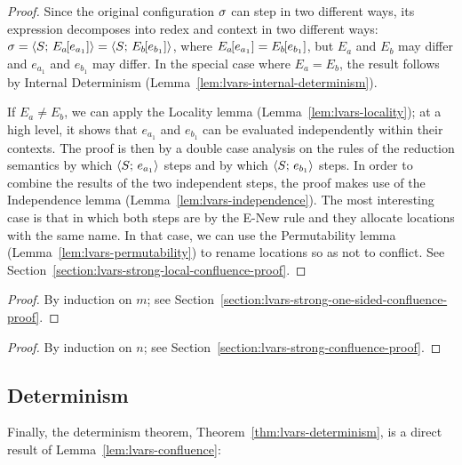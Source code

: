 \LVarsLemStrongLocalConfluence
\begin{proof}
  Since the original configuration $\sigma$ can step in two different
  ways, its expression decomposes into redex and context in two
  different ways: $\sigma = \langle S;\, E_a\hspace{-1mm}\left[e_{a_1}\right] \rangle =
  \langle S;\, E_b\hspace{-1mm}\left[e_{b_1}\right] \rangle$, where $E_a\hspace{-1mm}\left[e_{a_1}\right]
  = E_b\hspace{-1mm}\left[e_{b_1}\right]$, but $E_a$ and $E_b$ may differ and
  $e_{a_1}$ and $e_{b_1}$ may differ.  In the special case where $E_a
  = E_b$, the result follows by Internal Determinism
  (Lemma~\ref{lem:lvars-internal-determinism}).

  If $E_a \neq E_b$, we can apply the Locality lemma
  (Lemma~\ref{lem:lvars-locality}); at a high level, it shows that
  $e_{a_1}$ and $e_{b_1}$ can be evaluated independently within their
  contexts.  The proof is then by a double case analysis on the rules
  of the reduction semantics by which $\langle S;\, e_{a_1} \rangle$ steps and
  by which $\langle S;\, e_{b_1} \rangle$ steps.  In order to combine the
  results of the two independent steps, the proof makes use of the
  Independence lemma (Lemma~\ref{lem:lvars-independence}).  The most
  interesting case is that in which both steps are by the {\sc E-New}
  rule and they allocate locations with the same name.  In that case,
  we can use the Permutability lemma
  (Lemma~\ref{lem:lvars-permutability}) to rename locations so as not
  to conflict.  See
  Section~\ref{section:lvars-strong-local-confluence-proof}.
\end{proof}

\LVarsLemStrongOneSidedConfluence
\begin{proof}
  By induction on $m$; see
  Section~\ref{section:lvars-strong-one-sided-confluence-proof}.
\end{proof}

\LVarsLemStrongConfluence
\begin{proof}
  By induction on $n$; see
  Section~\ref{section:lvars-strong-confluence-proof}.
\end{proof}

\LVarsLemConfluence

\subsection{Determinism}

Finally, the determinism theorem, Theorem~\ref{thm:lvars-determinism},
is a direct result of Lemma~\ref{lem:lvars-confluence}:

\LVarsThmDeterminism

